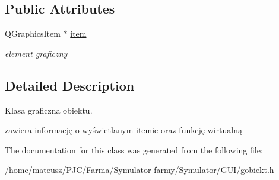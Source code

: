 \subsection*{Public Attributes}
\begin{DoxyCompactItemize}
\item 
\mbox{\label{class_g_obiekt_a805b718a614cb01f0facb76deedc3edb}} 
Q\+Graphics\+Item $\ast$ \mbox{\hyperlink{class_g_obiekt_a805b718a614cb01f0facb76deedc3edb}{item}}
\begin{DoxyCompactList}\small\item\em element graficzny \end{DoxyCompactList}\end{DoxyCompactItemize}


\subsection{Detailed Description}
Klasa graficzna obiektu. 

zawiera informację o wyświetlanym itemie oraz funkcję wirtualną 

The documentation for this class was generated from the following file\+:\begin{DoxyCompactItemize}
\item 
/home/mateusz/\+P\+J\+C/\+Farma/\+Symulator-\/farmy/\+Symulator/\+G\+U\+I/gobiekt.\+h\end{DoxyCompactItemize}
